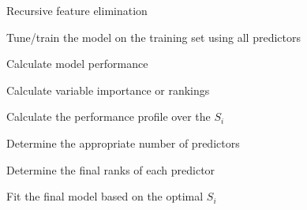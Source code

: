 \documentclass[12pt]{article}
\begin{document}
\begin{algorithm}
   \caption{Recursive feature elimination}
   \label{A:rfe}
   \SetLine
   \dontprintsemicolon


    \vspace*{3pt} Tune/train the model on the training set using all predictors\vspace*{3pt}\; 

    \vspace*{3pt} Calculate model performance\vspace*{3pt}\; 

     \vspace*{3pt} Calculate variable importance or rankings\vspace*{3pt} \; 


    \vspace*{3pt} Calculate the performance profile over the $S_i$ \vspace*{3pt}\;
    
    \vspace*{3pt} Determine the appropriate number of predictors\vspace*{3pt}\;

    \vspace*{3pt} Determine the final ranks of each predictor\vspace*{3pt}\;

    \vspace*{3pt} Fit the final model based on the optimal $S_i$ \vspace*{3pt}\;    
    
\end{algorithm}
\end{document}
